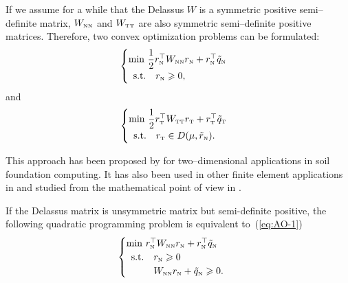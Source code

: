 {If we assume for a while that the Delassus $W$ is a symmetric positive semi--definite  matrix, $W_{{\hbox{\tiny{N}}}{\hbox{\tiny{N}}}}$ and $W_{{\hbox{\tiny{T}}}{\hbox{\tiny{T}}}}$ are also symmetric semi--definite positive matrices.
Therefore, two convex optimization problems can be formulated:
 \begin{equation}
  \label{eq:AO-3}
  \begin{cases}
    \min\, \Frac 1 2 r_\n^\top  W_{\n\n} r_\n + r_\n^\top \tilde q_\n \\
    \begin{array}{ll}
    \text{s.t.} & r_\n \geq 0,
  \end{array}\end{cases}
\end{equation}
and
\begin{equation}
  \label{eq:AO-4}
  \begin{cases}
    \min\, \Frac 1 2  r_\t^\top W _{\t\t} r_\t +  r_\t^\top \tilde q_\t \\
    \begin{array}{ll}
     \text{s.t.}  & r_\t \in D(\mu,\tilde r_{\n}).
  \end{array}
\end{cases}
\end{equation}


This approach has been proposed by \cite{Panagiotopoulos_IA1975} for two--dimensional applications in soil foundation computing. It has also been used  in other finite element applications  in \citep{Barbosa.Feijoo_CISM1985,Tzaferopoulos_CS1993} and studied from the mathematical point of view in \cite{Haslinger.Panagiotopoulos_PRSE1984,Haslinger.ea1996}.

\begin{remark}
  If the Delassus matrix is unsymmetric matrix but semi-definite positive, the following  quadratic programming problem is equivalent to~(\ref{eq:AO-1})
  \begin{equation}
  \label{eq:AO-3}
  \begin{cases}
    \min\,  r_\n^\top  W_{\n\n} r_\n + r_\n^\top \tilde q_\n \\
    \begin{array}{ll}
      \text{s.t.} & r_\n \geq 0\\
      & W_{\n\n} r_\n + \tilde  q_\n \geq 0.
    \end{array}
  \end{cases}
\end{equation}
\end{remark}



}
